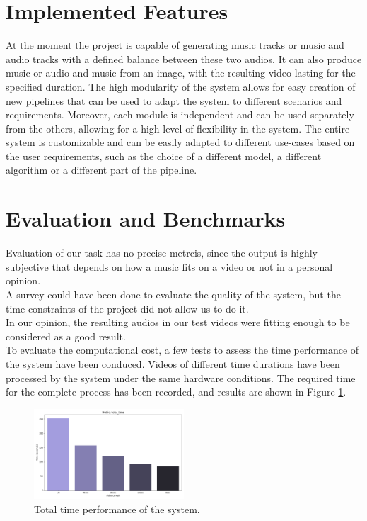 \documentclass[conference]{IEEEtran}
\begin{document}
\section{Implemented Features}
At the moment the project is capable of generating music tracks or music and audio tracks with a defined balance between these two audios. It can also produce music or audio and music from an image, with the resulting video lasting for the specified duration. 
The high modularity of the system allows for easy creation of new pipelines that can be used to adapt the system to different scenarios and requirements. Moreover, each 
module is independent and can be used separately from the others, allowing for a high level of flexibility in the system.  
The entire system is customizable and can be easily adapted to different use-cases based on the user requirements, such as the choice of a different model, a different algorithm or a different part of the pipeline.

\section{Evaluation and Benchmarks}
Evaluation of our task has no precise metrcis, since the output is highly subjective that depends on how a music fits on a video or not in a personal opinion.\\ A survey could have been done to evaluate the quality of the system, but the time constraints of the project did not allow us to do it.\\
In our opinion, the resulting audios in our test videos were fitting enough to be considered as a good result.\\
To evaluate the computational cost, a few tests to assess the time performance of the system have been conduced. Videos of different time durations have been processed by the system under the same hardware conditions. The required time for the complete process has been recorded, and results are shown in Figure \ref*{time_performance}.

\begin{figure}[H]
    \centerline{\includegraphics[width=0.5\textwidth]{../Presentation/graphs/total_time.png}}
    \caption{Total time performance of the system.}
    \label{time_performance}
\end{figure}
\end{document}
